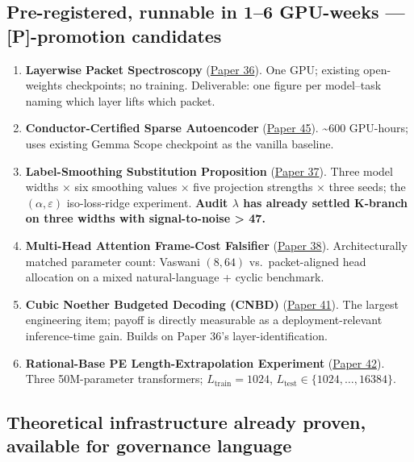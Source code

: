 \documentclass[
  letterpaper,
  11pt]{article}
\providecommand{\tightlist}{%
  \setlength{\itemsep}{0pt}\setlength{\parskip}{0pt}}
\theoremstyle{plain}
\theoremstyle{definition}
\theoremstyle{remark}
\begin{document}
\subsection{Pre-registered, runnable in 1--6 GPU-weeks --- {[}P{]}-promotion candidates}\label{pre-registered-runnable-in-16-gpu-weeks-p-promotion-candidates}

\begin{enumerate}
\def\labelenumi{\arabic{enumi}.}
\setcounter{enumi}{5}
\tightlist
\item
  \textbf{Layerwise Packet Spectroscopy} (\href{C:/Projects/simplicial/36_layerwise_packet_spectroscopy.md}{Paper 36}). One GPU; existing open-weights checkpoints; no training. Deliverable: one figure per model--task naming which layer lifts which packet.
\item
  \textbf{Conductor-Certified Sparse Autoencoder} (\href{C:/Projects/simplicial/45_conductor_certified_sparse_autoencoders.md}{Paper 45}). \textasciitilde600 GPU-hours; uses existing Gemma Scope checkpoint as the vanilla baseline.
\item
  \textbf{Label-Smoothing Substitution Proposition} (\href{C:/Projects/simplicial/37_label_smoothing_in_the_conductor_blind_spot.md}{Paper 37}). Three model widths × six smoothing values × five projection strengths × three seeds; the \((\alpha, \varepsilon)\) iso-loss-ridge experiment. \textbf{Audit \(\lambda\) has already settled K-branch on three widths with signal-to-noise \textgreater{} 47.}
\item
  \textbf{Multi-Head Attention Frame-Cost Falsifier} (\href{C:/Projects/simplicial/38_multi_head_attention_as_frame_cost_minimization.md}{Paper 38}). Architecturally matched parameter count: Vaswani \((8, 64)\) vs.~packet-aligned head allocation on a mixed natural-language + cyclic benchmark.
\item
  \textbf{Cubic Noether Budgeted Decoding (CNBD)} (\href{C:/Projects/simplicial/41_cubic_noether_budgeted_decoding.md}{Paper 41}). The largest engineering item; payoff is directly measurable as a deployment-relevant inference-time gain. Builds on Paper 36's layer-identification.
\item
  \textbf{Rational-Base PE Length-Extrapolation Experiment} (\href{C:/Projects/simplicial/42_sinusoidal_pe_as_non_rational_conductor_algebra.md}{Paper 42}). Three 50M-parameter transformers; \(L_{\text{train}} = 1024\), \(L_{\text{test}} \in \{1024, \ldots, 16384\}\).
\end{enumerate}

\subsection{Theoretical infrastructure already proven, available for governance language}\label{theoretical-infrastructure-already-proven-available-for-governance-language}
\end{document}
